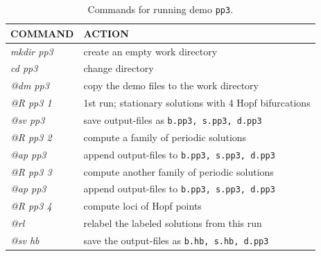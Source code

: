 \documentclass[12pt]{report}
\begin{document}
\begin{table}[htbp]
\begin{center}
\begin{tabular}{| l | l |}
\hline
  COMMAND  & ACTION \\
\hline
  {\it mkdir pp3} & create an empty work directory \\ 
  {\it cd pp3} & change directory \\
  {\it @dm pp3} & copy the demo files to the work directory \\
\hline
  {\it @R pp3 1} & 1st run; stationary solutions with 4 Hopf bifurcations \\ 
  {\it @sv pp3} & save output-files as {\tt b.pp3, s.pp3, d.pp3} \\ 
\hline
  {\it @R pp3 2} & compute a family of periodic solutions \\ 
  {\it @ap pp3} & append output-files to {\tt b.pp3, s.pp3, d.pp3} \\ 
\hline
  {\it @R pp3 3} & compute another family of periodic solutions \\ 
  {\it @ap pp3} & append output-files to {\tt b.pp3, s.pp3, d.pp3} \\ 
\hline
  {\it @R pp3 4} & compute loci of Hopf points \\ 
  {\it @rl} & relabel the labeled solutions from this run \\ 
  {\it @sv hb} & save the output-files as {\tt b.hb, s.hb, d.pp3} \\ 
\hline
\end{tabular}
\caption{Commands for running demo {\tt pp3}.}
\label{tbl:demo_pp3}
\end{center}
\end{table}
\end{document}
